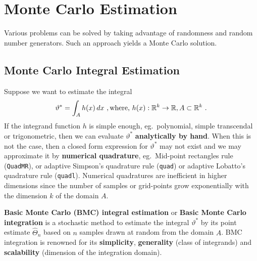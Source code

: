 \chapter{Monte Carlo Estimation}\label{S:MCEstim}
Various problems can be solved by taking advantage of randomness and random number generators.  Such an approach yields a Monte Carlo solution.  %

\section{Monte Carlo Integral Estimation}\label{S:BMC}
Suppose we want to estimate the integral
\[
\vartheta^* = \int_{A} h(x) \, dx \ , \text{where, } h(x): \mathbb{R}^k \to \mathbb{R}, A \subset \mathbb{R}^k \ .
\]
If the integrand function $h$ is simple enough, eg.~polynomial, simple transcendal or trigonometric, then we can evaluate $\vartheta^*$ {\bf analytically by hand}.  When this is not the case, then a closed form expression for $\vartheta^*$ may not exist and we may approximate it by {\bf numerical quadrature}, eg.~Mid-point rectangles rule ({\tt QuadMR}), or adaptive Simpson's quadrature rule ({\tt quad}) or adaptive Lobatto's quadrature rule ({\tt quadl}).  Numerical quadratures are inefficient in higher dimensions since the number of samples or grid-points grow exponentially with the dimension $k$ of the domain $A$.

{\bf Basic Monte Carlo (BMC) integral estimation} or {\bf Basic Monte Carlo integration} is a stochastic method to estimate the integral $\vartheta^*$ by its point estimate $\widehat{\varTheta}_n$ based on $n$ samples drawn at random from the domain $A$.  BMC integration is renowned for its {\bf simplicity}, {\bf generality} (class of integrands) and {\bf scalability} (dimension of the  integration domain).


